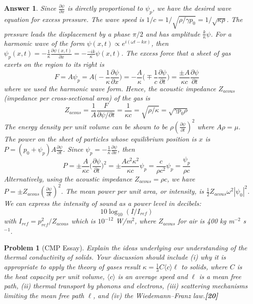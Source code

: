 \documentclass[a4paper]{article}
\newtheorem{ans}{Answer}[subsection]
\theoremstyle{new}
\newtheorem{qns}{Problem}[subsection]
\begin{document}
\begin{ans}
Since $\frac{\partial\psi}{\partial x}$ is directly proportional to $\psi_p$, we have the desired wave equation for excess pressure. The wave speed is $1/c=1/\sqrt{\rho/\gamma p_0}=1/\sqrt{\kappa\rho}$. The pressure leads the displacement by a phase $\pi/2$ and has amplitude $\frac{k}{\kappa}\psi$. For a harmonic wave of the form $\psi(x,t)\propto e^{i(\omega t-kx)}$, then $\psi_p(x,t)=-\frac{1}{\kappa}\frac{\partial\psi(x,t)}{\partial x}=-\frac{-ik}{\kappa}\psi(x,t)$. The excess force that a sheet of gas exerts on the region to its right is $$F=A\psi_p=A\bigg(-\frac{1}{\kappa}\frac{\partial\psi}{\partial x}\bigg)=-\frac{A}{\kappa}\bigg(\mp\frac{1}{c}\frac{\partial\psi}{\partial t}\bigg)=\frac{\pm A}{\kappa c}\frac{\partial\psi}{\partial t}$$
where we used the harmonic wave form. Hence, the acoustic impedance  $Z_{acous}$ (impedance per cross-sectional area) of the gas is $$Z_{acous}=\frac{1}{A}\frac{F}{\partial\psi/\partial t}=\frac{1}{\kappa c}=\sqrt{\rho/\kappa}=\sqrt{\gamma p_0\rho}$$
The energy density per unit volume can be shown to be $\rho(\frac{\partial\psi}{\partial t})^2$ where $A\rho=\mu$. The power on the sheet of particles whose equilibrium position is $x$ is $P=(p_0+\psi_p)A\frac{\partial\psi}{\partial t}$. Since $\psi_p=-\frac{1}{\kappa}\frac{\partial\psi}{\partial x}$, then $$P=\pm\frac{A}{\kappa c}\bigg(\frac{\partial\psi}{\partial t}\bigg)^2=\pm\frac{Ac^2\kappa^2}{\kappa c}\psi_p=\frac{c}{\rho c^2}\psi_p=\frac{\psi_p}{\rho c}$$ 
Alternatively, using the acoustic impedance $Z_{acous}=\rho c$, we have $P=\pm Z_{acous}(\frac{\partial\psi}{\partial t})^2$. The mean power per unit area, or intensity, is  $\frac{1}{2}Z_{acous}\omega^2|\psi_0|^2$. We can express the intensity of sound as a power level in decibels:
$$10\log_{10}(I/I_{ref})$$
with $I_{ref}=p_{ref}^2/Z_{acous}$ which is $10^{-12}$ W/m$^2$, where $Z_{acous}$ for air is 400 kg m$^{-2}$ s$^{-1}$.
\end{ans}
\newpage
\begin{qns}[CMP Essay]
Explain the ideas underlying our understanding of the thermal conductivity of solids. Your discussion should include (i) why it is appropriate to apply the theory of gases result $\kappa=\frac{1}{3}C\langle c\rangle\ell$ to solids, where $C$ is the heat capacity per unit volume, $\langle c\rangle$ is an average speed and $\ell$ is a mean free path, (ii) thermal transport by phonons and electrons, (iii) scattering mechanisms limiting the mean free path $\ell$, and (iv) the Wiedemann–Franz law.\hfill\textbf{[20]}
\end{qns}
\end{document}
